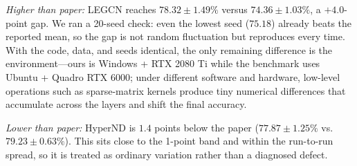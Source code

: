 \documentclass[11pt,a4paper]{article}
\begin{document}
\noindent\textit{Higher than paper:} LEGCN reaches $78.32\pm1.49\%$ versus $74.36\pm1.03\%$, a $+4.0$-point gap. We ran a 20-seed check: even the lowest seed ($75.18$) already beats the reported mean, so the gap is not random fluctuation but reproduces every time. With the code, data, and seeds identical, the only remaining difference is the environment—ours is Windows + RTX 2080 Ti while the benchmark uses Ubuntu + Quadro RTX 6000; under different software and hardware, low-level operations such as sparse-matrix kernels produce tiny numerical differences that accumulate across the layers and shift the final accuracy.

\noindent\textit{Lower than paper:} HyperND is $1.4$ points below the paper ($77.87\pm1.25\%$ vs. $79.23\pm0.63\%$). This sits close to the 1-point band and within the run-to-run spread, so it is treated as ordinary variation rather than a diagnosed defect.
\end{document}
